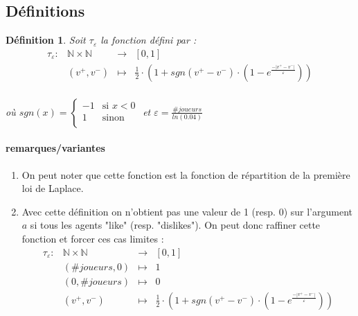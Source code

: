 \documentclass[12pt]{article}
\theoremstyle{defi}
\newtheorem{definition}{Définition}[section]
\theoremstyle{not}
\theoremstyle{prob}
\begin{document}
  \subsection{Définitions}
  \label{ref:def_tau}
      \begin{definition}
        Soit $\tau_\varepsilon$ la fonction défini par :
        $$\begin{array}{rclc}
          \tau_\varepsilon :  & \mathbb{N} \times \mathbb{N} & \longrightarrow & [0, 1] \\
          & (v^+,v^-) & \longmapsto & \frac{1}{2} \cdot \left(1 + sgn(v^+ - v^-) \cdot \left(1 - e^{\frac{-|v^+ - v^-|}{\varepsilon}}\right)\right)\\
        \end{array}$$

        où $sgn(x) = \left\{
        \begin{array}{ll}
          -1  & \mbox{si } x < 0 \\
          1 & \mbox{sinon} \\
        \end{array}
        \right.$ et $\varepsilon = \frac{\#joueurs}{ln(0.04)}$
      \end{definition}

      \paragraph{remarques/variantes}
      \label{ref:rem_def_tau}
        \begin{enumerate}
          \item On peut noter que cette fonction est la fonction de répartition de la première loi de Laplace.
          \item Avec cette définition on n'obtient pas une valeur de 1 (resp. $0$) sur l'argument $a$ si tous les agents "like" (resp. "dislikes"). On peut donc raffiner cette fonction et forcer ces cas limites :
          $$\begin{array}{rclc}
            \tau_\varepsilon :  & \mathbb{N} \times \mathbb{N} & \longrightarrow & [0, 1] \\
            & (\#joueurs, 0) & \longmapsto & 1 \\
            & (0, \#joueurs) & \longmapsto & 0 \\
            & (v^+,v^-) & \longmapsto & \frac{1}{2} \cdot \left(1 + sgn(v^+ - v^-) \cdot \left(1 - e^{\frac{-|v^+ - v^-|}{\varepsilon}}\right)\right)\\
          \end{array}$$
        \end{enumerate}
\end{document}
